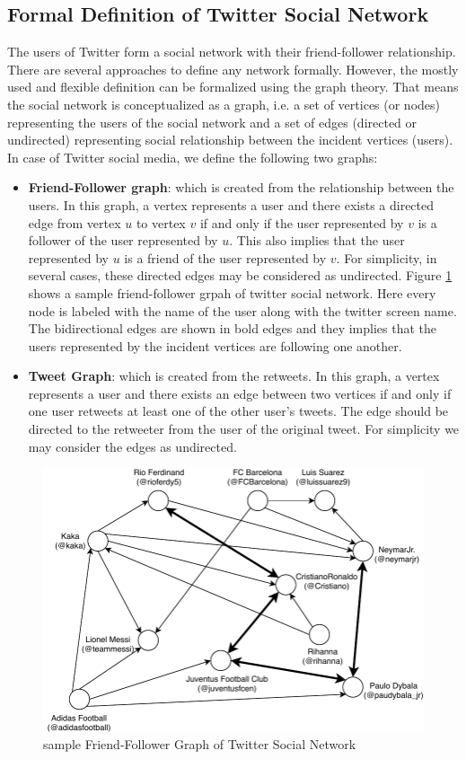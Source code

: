 \documentclass[sigconf]{acmart}
\begin{document}
\subsection{Formal Definition of Twitter Social Network}
The users of Twitter form a social network with their friend-follower relationship. There are several approaches to define any network formally. However, the mostly used and flexible definition can be formalized using the graph theory. That means the social network is conceptualized as a graph, i.e. a set of vertices (or nodes) representing the users of the social network and a set of edges (directed or undirected) representing social relationship between the incident vertices (users). In case of Twitter social media, we define the following two graphs:
\begin{itemize}
	\item \textbf{Friend-Follower graph}: which is created from the relationship between the users. In this graph, a vertex represents a user and there exists a directed edge from vertex $u$ to vertex $v$ if and only if the user represented by $v$ is a follower of the user represented by $u$. This also implies that the user represented by $u$ is a friend of the user represented by $v$. For simplicity, in several cases, these directed edges may be considered as undirected. Figure \ref{friend-follower graph} shows a sample friend-follower grpah of twitter social network. Here every node is labeled with the name of the user along with the twitter screen name. The bidirectional edges are shown in bold edges and they implies that the users represented by the incident vertices are following one another.   
	\item \textbf{Tweet Graph}: which is created from the retweets. In this graph, a vertex represents a user and there exists an edge between two vertices if and only if one user retweets at least one of the other user's tweets. The edge should be directed to the retweeter from the user of the original tweet. For simplicity we may consider the edges as undirected.

\end{itemize}
 
\begin{figure}
	\includegraphics[width=.5\textwidth]{friend_follower_graph.pdf}
	\caption{sample Friend-Follower Graph of Twitter Social Network}
	\label{friend-follower graph}
\end{figure}
\end{document}
